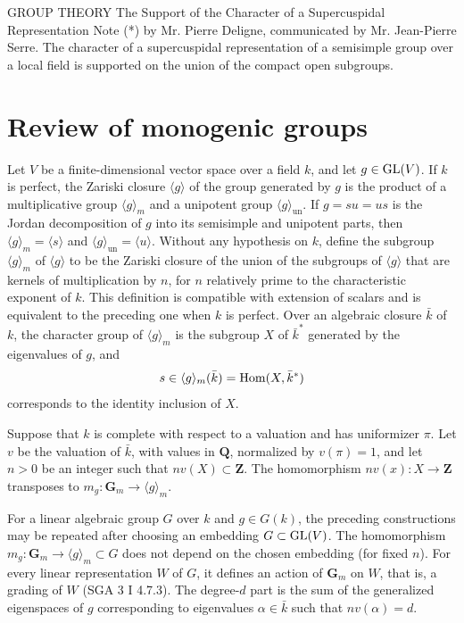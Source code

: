 \DTitleBlock
  {GROUP THEORY}
  {The Support of the Character of a Supercuspidal Representation}
  {Note (*) by Mr. Pierre Deligne, communicated by Mr. Jean-Pierre Serre.}
  {The character of a supercuspidal representation of a semisimple group over a local field is supported on the union of the compact open subgroups.}

\section{Review of monogenic groups}

Let \(V\) be a finite-dimensional vector space over a field \(k\), and let
\(g\in\operatorname{GL}(V)\). If \(k\) is perfect, the Zariski closure
\(\langle g\rangle\) of the group generated by \(g\) is the product of a
multiplicative group \(\langle g\rangle_m\) and a unipotent group
\(\langle g\rangle_{\mathrm{un}}\). If \(g=su=us\) is the Jordan
decomposition of \(g\) into its semisimple and unipotent parts, then
\(\langle g\rangle_m=\langle s\rangle\) and
\(\langle g\rangle_{\mathrm{un}}=\langle u\rangle\). Without any hypothesis
on \(k\), define the subgroup \(\langle g\rangle_m\) of
\(\langle g\rangle\) to be the Zariski closure of the union of the subgroups
of \(\langle g\rangle\) that are kernels of multiplication by \(n\), for
\(n\) relatively prime to the characteristic exponent of \(k\). This
definition is compatible with extension of scalars and is equivalent to the
preceding one when \(k\) is perfect. Over an algebraic closure \(\bar{k}\) of
\(k\), the character group of \(\langle g\rangle_m\) is the subgroup \(X\)
of \(\bar{k}^{*}\) generated by the eigenvalues of \(g\), and
\[
  s\in\langle g\rangle_m(\bar{k})=\operatorname{Hom}(X,\bar{k}^{*})
\]
corresponds to the identity inclusion of \(X\).

Suppose that \(k\) is complete with respect to a valuation and has uniformizer
\(\pi\). Let \(v\) be the valuation of \(\bar{k}\), with values in
\(\mathbf{Q}\), normalized by \(v(\pi)=1\), and let \(n>0\) be an integer
such that \(nv(X)\subset\mathbf{Z}\). The homomorphism
\(nv(x):X\to\mathbf{Z}\) transposes to
\(m_g:\mathbf{G}_m\to\langle g\rangle_m\).

For a linear algebraic group \(G\) over \(k\) and \(g\in G(k)\), the preceding
constructions may be repeated after choosing an embedding
\(G\subset\operatorname{GL}(V)\). The homomorphism
\(m_g:\mathbf{G}_m\to\langle g\rangle_m\subset G\) does not depend on the
chosen embedding (for fixed \(n\)). For every linear representation \(W\) of
\(G\), it defines an action of \(\mathbf{G}_m\) on \(W\), that is, a grading
of \(W\) (SGA 3 I 4.7.3). The degree-\(d\) part is the sum of the generalized
eigenspaces of \(g\) corresponding to eigenvalues \(\alpha\in\bar{k}\) such
that \(nv(\alpha)=d\).

